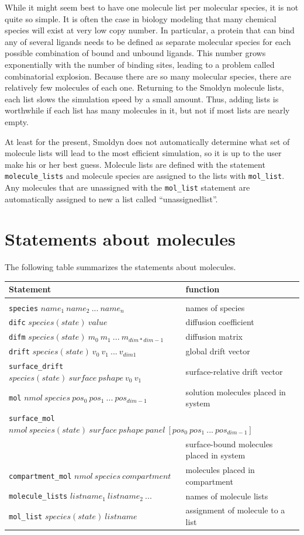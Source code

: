 \documentclass {scrbook}
\newcommand {\ttt} {\texttt}
\begin{document}
While it might seem best to have one molecule list per molecular species, it is not quite so simple. It is often the case in biology modeling that many chemical species will exist at very low copy number. In particular, a protein that can bind any of several ligands needs to be defined as separate molecular species for each possible combination of bound and unbound ligands. This number grows exponentially with the number of binding sites, leading to a problem called combinatorial explosion. Because there are so many molecular species, there are relatively few molecules of each one. Returning to the Smoldyn molecule lists, each list slows the simulation speed by a small amount. Thus, adding lists is worthwhile if each list has many molecules in it, but not if most lists are nearly empty.

At least for the present, Smoldyn does not automatically determine what set of molecule lists will lead to the most efficient simulation, so it is up to the user make his or her best guess. Molecule lists are defined with the statement \ttt{molecule\_lists} and molecule species are assigned to the lists with \ttt{mol\_list}. Any molecules that are unassigned with the \ttt{mol\_list} statement are automatically assigned to new a list called ``unassignedlist''.

\section{Statements about molecules}

The following table summarizes the statements about molecules.

\begin{longtable}[c]{ll}
Statement & function\\
\hline \\
\ttt{species} $name_1\ name_2\ ...\ name_n$ & names of species\\
\ttt{difc} $species(state)\ value$ & diffusion coefficient\\
\ttt{difm} $species(state)\ m_0\ m_1\ ...\ m_{dim*dim-1}$ & diffusion matrix\\
\ttt{drift} $species(state)\ v_0\ v_1\ ...\ v_{dim1}$ & global drift vector\\
\ttt{surface\_drift} $species(state)\ surface\ pshape\ v_0\ v_1$ & surface-relative drift vector\\
\ttt{mol} $nmol\ species\ pos_0\ pos_1\ ...\ pos_{dim-1}$ & solution molecules placed in system\\
\multicolumn{2}{l}{
\ttt{surface\_mol} $nmol\ species(state)\ surface\ pshape\ panel\ [pos_0\ pos_1\ ...\ pos_{dim-1}]$}\\
 & surface-bound molecules placed in system\\
\ttt{compartment\_mol} $nmol\ species\ compartment$ & molecules placed in compartment\\
\ttt{molecule\_lists} $listname_1\ listname_2\ ...$ & names of molecule lists\\
\ttt{mol\_list} $species(state)\ listname$ & assignment of molecule to a list
\end{longtable}
\end{document}
